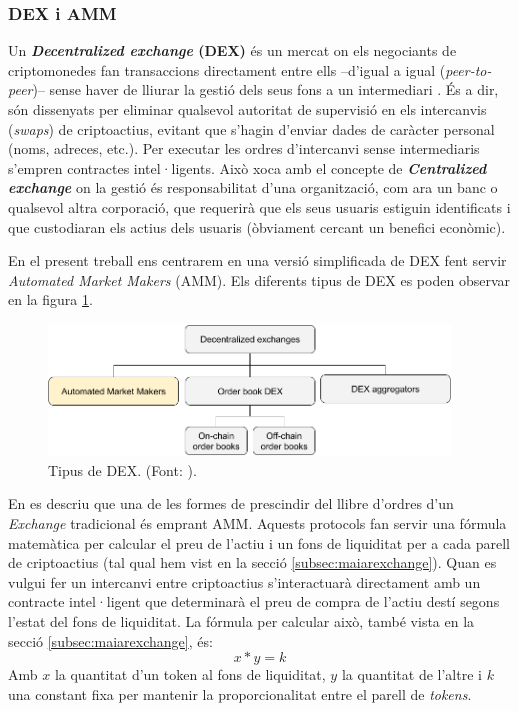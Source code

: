 \documentclass[11pt,a4paper]{article}
\begin{document}
\subsubsection{DEX i AMM}\label{subsub:dexamm}

Un \textbf{\textit{Decentralized exchange} (DEX)} és un mercat on els negociants de criptomonedes fan transaccions directament entre ells –d'igual a igual (\textit{peer-to-peer})– sense haver de lliurar la gestió dels seus fons a un intermediari \cite{cointelegraph}. És a dir, són dissenyats per eliminar qualsevol autoritat de supervisió en els intercanvis (\textit{swaps}) de criptoactius, evitant que s'hagin d'enviar dades de caràcter personal (noms, adreces, etc.). Per executar les ordres d'intercanvi sense intermediaris s'empren contractes intel·ligents. Això xoca amb el concepte de \textit{\textbf{Centralized exchange}} on la gestió és responsabilitat d'una organització, com ara un banc o qualsevol altra corporació, que requerirà que els seus usuaris estiguin identificats i que custodiaran els actius dels usuaris (òbviament cercant un benefici econòmic).
 
En el present treball ens centrarem en una versió simplificada de DEX fent servir \textit{Automated Market Makers} (AMM). Els diferents tipus de DEX es poden observar en la figura \ref{fig:dextypes}.
\begin{figure}[h]
\includegraphics[width=0.95\textwidth]{DEXtypes.png}
\centering
\caption{Tipus de DEX. (Font: \cite{cointelegraph}).}\label{fig:dextypes}
\end{figure} 

En \cite{delarosa} es descriu que una de les formes de prescindir del llibre d'ordres d'un \textit{Exchange} tradicional és emprant AMM. Aquests protocols fan servir una fórmula matemàtica per calcular el preu de l'actiu i un fons de liquiditat per a cada parell de criptoactius (tal qual hem vist en la secció \ref{subsec:maiarexchange}). Quan es vulgui fer un intercanvi entre criptoactius s'interactuarà directament amb un contracte intel·ligent que determinarà el preu de compra de l'actiu destí segons l'estat del fons de liquiditat. La fórmula per calcular això, també vista en la secció \ref{subsec:maiarexchange}, és:
\[x * y = k\]
Amb \(x\) la quantitat d'un token al fons de liquiditat, \(y\) la quantitat de l'altre i \(k\) una constant fixa per mantenir la proporcionalitat entre el parell de \textit{tokens}.
\end{document}

